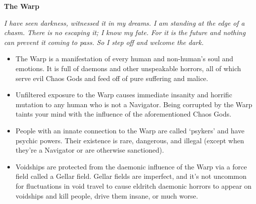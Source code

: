 \documentclass[10pt,a4paper]{article}
\newcommand{\rpgsection}[1]{%
  \vspace{0.8em}%
  {\headerfont\bfseries\Large #1}\par%
  \vspace{0.5em}%
}
\begin{document}
\begin{multicols}{2}
\rpgsection{The Warp}
\textit{I have seen darkness, witnessed it in my dreams. I am standing at the edge of a chasm. There is no escaping it; I know my fate. For it is the future and nothing can prevent it coming to pass. So I step off and welcome the dark.}

\begin{itemize}
  \item The Warp is a manifestation of every human and non-human’s soul and emotions. It is full of daemons and other unspeakable horrors, all of which serve evil Chaos Gods and feed off of pure suffering and malice.
  \item Unfiltered exposure to the Warp causes immediate insanity and horrific mutation to any human who is not a Navigator. Being corrupted by the Warp taints your mind with the influence of the aforementioned Chaos Gods.
  \item People with an innate connection to the Warp are called ‘psykers’ and have psychic powers. Their existence is rare, dangerous, and illegal (except when they’re a Navigator or are otherwise sanctioned).
  \item Voidships are protected from the daemonic influence of the Warp via a force field called a Gellar field. Gellar fields are imperfect, and it’s not uncommon for fluctuations in void travel to cause eldritch daemonic horrors to appear on voidships and kill people, drive them insane, or much worse.
\end{itemize}


\end{multicols}
\end{document}
